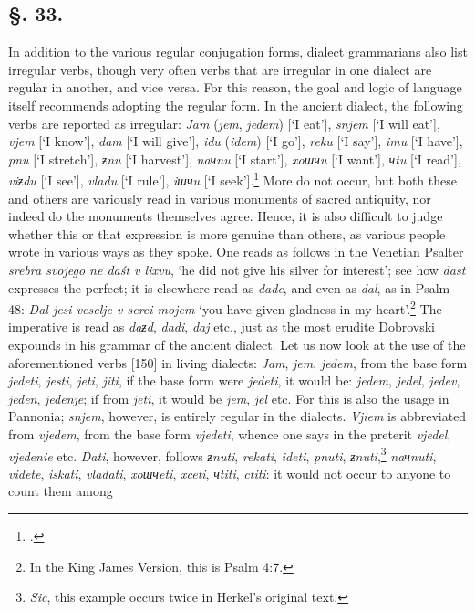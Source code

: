 \subsection*{\hspace*{\fill}§. 33.\hspace*{\fill}}

In addition to the various regular conjugation forms, dialect grammarians also list irregular verbs, though very often verbs that are irregular in one dialect are regular in another, and vice versa. For this reason, the goal and logic of language itself recommends adopting the regular form. In the ancient dialect, the following verbs are reported as irregular: \textit{Jam} (\textit{jem}, \textit{jedem}) [‘I eat’], \textit{snjem} [‘I will eat’], \textit{vjem} [‘I know’], \textit{dam} [‘I will give’], \textit{idu} (\textit{idem}) [‘I go’], \textit{reku} [‘I say’], \textit{imu} [‘I have’], \textit{pnu} [‘I stretch’], \textit{ƶnu} [‘I harvest’], \textit{naчnu} [‘I start’], \textit{xoшчu} [‘I want’], \textit{чtu} [‘I read’], \textit{viƶdu} [‘I see’], \textit{vladu} [‘I rule’], \textit{iшчu} [‘I seek’].\footnote{\citet[537--543]{dobrovsky_institutiones_1822}.} More do not occur, but both these and others are variously read in various monuments of sacred antiquity, nor indeed do the monuments themselves agree. Hence, it is also difficult to judge whether this or that expression is more genuine than others, as various people wrote in various ways as they spoke. One reads as follows in the Venetian Psalter \textit{srebra svojego ne daśt v lixvu}, ‘he did not give his silver for interest’; see how \textit{dast} expresses the perfect; it is elsewhere read as \textit{dade}, and even as \textit{dal}, as in Psalm 48: \textit{Dal jesi veselje v serci mojem} ‘you have given gladness in my heart’.\footnote{In the King James Version, this is Psalm 4:7.} The imperative is read as \textit{daƶd}, \textit{dadi}, \textit{daj} etc., just as the most erudite Dobrovski expounds in his grammar of the ancient dialect. Let us now look at the use of the aforementioned verbs [150] in living dialects: \textit{Jam}, \textit{jem}, \textit{jedem}, from the base form \textit{jedeti}, \textit{jesti}, \textit{jeti}, \textit{jiti}, if the base form were \textit{jedeti}, it would be: \textit{jedem}, \textit{jedel}, \textit{jedev}, \textit{jeden}, \textit{jedenje}; if from \textit{jeti}, it would be \textit{jem}, \textit{jel} etc. For this is also the usage in Pannonia; \textit{snjem}, however, is entirely regular in the dialects. \textit{Vjiem} is abbreviated from \textit{vjedem}, from the base form \textit{vjedeti}, whence one says in the preterit \textit{vjedel}, \textit{vjedenie} etc. \textit{Dati}, however, follows \textit{ƶnuti}, \textit{rekati}, \textit{ideti}, \textit{pnuti}, \textit{ƶnuti},\footnote{\textit{Sic}, this example occurs twice in Herkel’s original text.} \textit{naчnuti}, \textit{videte}, \textit{iskati}, \textit{vladati}, \textit{xoшчeti}, \textit{xceti}, \textit{чtiti}, \textit{ctiti}: it would not occur to anyone to count them among 